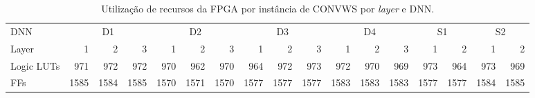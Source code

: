\begin{table}[ht!]
\centering
\caption{Utilização de recursos da FPGA por instância de CONVWS por \textit{layer} e DNN.}
\label{tab:5-vivado-conv}
\begin{tabular}{lrrrrrrrrrrrrrrrr}
\toprule
DNN & \multicolumn{3}{c}{D1} & \multicolumn{3}{c}{D2} & \multicolumn{3}{c}{D3} & \multicolumn{3}{c}{D4} & \multicolumn{2}{c}{S1} & \multicolumn{2}{c}{S2} \\
\cmidrule(lr){2-4} \cmidrule(lr){5-7} \cmidrule(lr){8-10} \cmidrule(lr){11-13} \cmidrule(lr){14-15} \cmidrule(l){16-17}
Layer & 1 & 2 & 3 & 1 & 2 & 3 & 1 & 2 & 3 & 1 & 2 & 3 & 1 & 2 & 1 & 2 \\
\midrule
Logic LUTs &        971 &        972 &        972 &        970 &        962 &        970 &        964 &        972 &        973 &        972 &        970 &        969 &        973 &        964 &        973 &        969 \\
FFs & 1585 & 1584 & 1585 & 1570 & 1571 & 1570 & 1577 & 1577 & 1577 & 1583 & 1583 & 1583 & 1577 & 1577 & 1584 & 1585 \\
\bottomrule
\end{tabular}
\end{table}